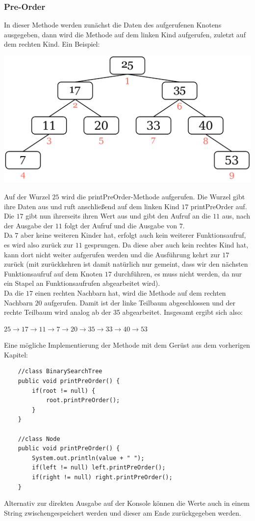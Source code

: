 \documentclass{article}
\begin{document}
\subsubsection{Pre-Order}
In dieser Methode werden zunächst die Daten des aufgerufenen Knotens ausgegeben, dann wird die Methode auf dem linken Kind aufgerufen, zuletzt auf dem rechten Kind. Ein Beispiel:
\begin{center}
    \includegraphics[scale=0.2]{../media/preorder.png}
\end{center}
Auf der Wurzel $25$ wird die printPreOrder-Methode aufgerufen. Die Wurzel gibt ihre Daten aus und ruft anschließend auf dem linken Kind $17$ printPreOrder auf. Die $17$ gibt nun ihrerseits ihren Wert aus und gibt den Aufruf an die $11$ aus, nach der Ausgabe der $11$ folgt der Aufruf und die Ausgabe von $7$. \\
Da $7$ aber keine weiteren Kinder hat, erfolgt auch kein weiterer Funktionsaufruf, es wird also zurück zur $11$ gesprungen. Da diese aber auch kein rechtes Kind hat, kann dort nicht weiter aufgerufen werden und die Ausführung kehrt zur $17$ zurück (mit zurückkehren ist damit natürlich nur gemeint, dass wir den nächsten Funktionsaufruf auf dem Knoten $17$ durchführen, es muss nicht  werden, da nur ein Stapel an Funktionsaufrufen abgearbeitet wird). \\
Da die $17$ einen rechten Nachbarn hat, wird die Methode auf dem rechten Nachbarn $20$ aufgerufen. Damit ist der linke Teilbaum abgeschlossen und der rechte Teilbaum wird analog ab der 35 abgearbeitet. Insgesamt ergibt sich also:
\begin{center}
    $25 \rightarrow 17 \rightarrow 11 \rightarrow 7 \rightarrow 20 \rightarrow 35 \rightarrow 33 \rightarrow 40 \rightarrow 53$
\end{center}
Eine mögliche Implementierung der Methode mit dem Gerüst aus dem vorherigen Kapitel: 
\begin{verbatim}
    //class BinarySearchTree
    public void printPreOrder() {
        if(root != null) {
            root.printPreOrder();
        }
    }

    //class Node 
    public void printPreOrder() {
        System.out.println(value + " ");
        if(left != null) left.printPreOrder();
        if(right != null) right.printPreOrder();
    }
\end{verbatim}
Alternativ zur direkten Ausgabe auf der Konsole können die Werte auch in einem String zwischengespeichert werden und dieser am Ende zurückgegeben werden. 
\end{document}

